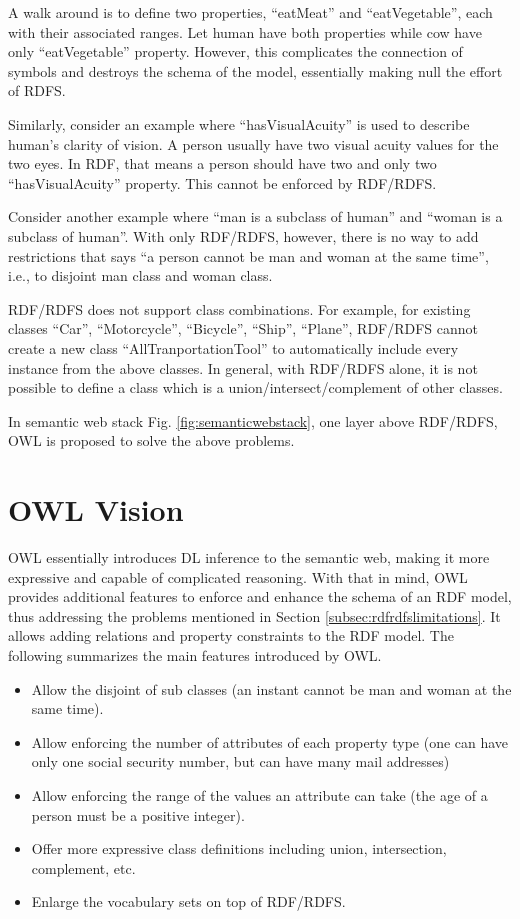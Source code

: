 A walk around is to define two properties, ``eatMeat'' and ``eatVegetable'', each with their associated ranges. Let human have both properties while cow have only ``eatVegetable'' property. However, this complicates the connection of symbols and destroys the schema of the model, essentially making null the effort of RDFS.

Similarly, consider an example where ``hasVisualAcuity'' is used to describe human's clarity of vision. A person usually have two visual acuity values for the two eyes. In RDF, that means a person should have two and only two ``hasVisualAcuity'' property. This cannot be enforced by RDF/RDFS.

Consider another example where ``man is a subclass of human'' and ``woman is a subclass of human''. With only RDF/RDFS, however, there is no way to add restrictions that says ``a person cannot be man and woman at the same time'', i.e., to disjoint man class and woman class.

RDF/RDFS does not support class combinations. For example, for existing classes ``Car'', ``Motorcycle'', ``Bicycle'', ``Ship'', ``Plane'', RDF/RDFS cannot create a new class ``AllTranportationTool'' to automatically include every instance from the above classes. In general, with RDF/RDFS alone, it is not possible to define a class which is a union/intersect/complement of other classes.

In semantic web stack Fig. \ref{fig:semanticwebstack}, one layer above RDF/RDFS, OWL is proposed to solve the above problems.

\section{OWL Vision}

OWL essentially introduces DL inference to the semantic web, making it more expressive and capable of complicated reasoning. With that in mind, OWL provides additional features to enforce and enhance the schema of an RDF model, thus addressing the problems mentioned in Section \ref{subsec:rdfrdfslimitations}. It allows adding relations and property constraints to the RDF model. The following summarizes the main features introduced by OWL.
\begin{itemize}
	\item Allow the disjoint of sub classes (an instant cannot be man and woman at the same time).
	\item Allow enforcing the number of attributes of each property type (one can have only one social security number, but can have many mail addresses)
	\item Allow enforcing the range of the values an attribute can take (the age of a person must be a positive integer).
	\item Offer more expressive class definitions including union, intersection, complement, etc.
	\item Enlarge the vocabulary sets on top of RDF/RDFS.
\end{itemize}

